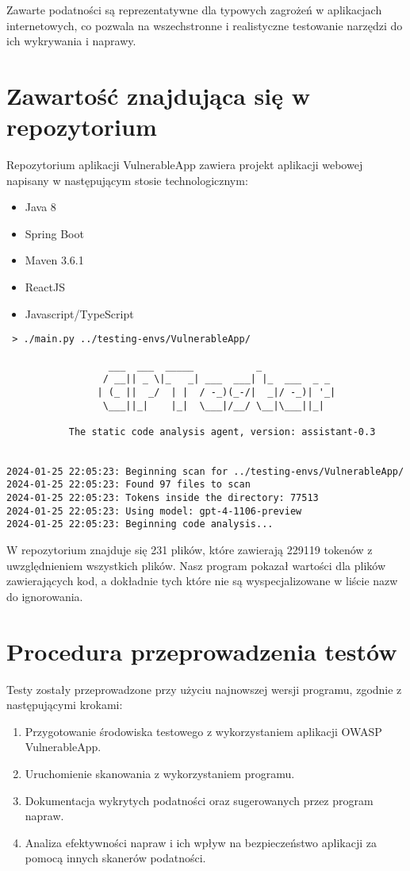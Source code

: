 Zawarte podatności są reprezentatywne dla typowych zagrożeń w aplikacjach internetowych, co pozwala na wszechstronne i realistyczne testowanie narzędzi do ich wykrywania i naprawy.

\section{Zawartość znajdująca się w repozytorium}
Repozytorium aplikacji VulnerableApp zawiera projekt aplikacji webowej napisany w następującym stosie technologicznym:
\begin{itemize}
    \item Java 8
    \item Spring Boot
    \item Maven 3.6.1
    \item ReactJS
    \item Javascript/TypeScript
\end{itemize} 

\begin{verbatim}
 > ./main.py ../testing-envs/VulnerableApp/

                  ___  ___  _____           _             
                 / __|| _ \|_   _| ___  ___| |_  ___  _ _ 
                | (_ ||  _/  | |  / -_)(_-/|  _|/ -_)| '_|
                 \___||_|    |_|  \___|/__/ \__|\___||_|  

           The static code analysis agent, version: assistant-0.3


2024-01-25 22:05:23: Beginning scan for ../testing-envs/VulnerableApp/
2024-01-25 22:05:23: Found 97 files to scan
2024-01-25 22:05:23: Tokens inside the directory: 77513
2024-01-25 22:05:23: Using model: gpt-4-1106-preview
2024-01-25 22:05:23: Beginning code analysis...
\end{verbatim}

W repozytorium znajduje się 231 plików, które zawierają 229119 tokenów z uwzględnieniem wszystkich plików. Nasz program pokazał wartości dla plików zawierających kod, a dokładnie tych które nie są wyspecjalizowane w liście nazw do ignorowania.

\section{Procedura przeprowadzenia testów}
Testy zostały przeprowadzone przy użyciu najnowszej wersji programu, zgodnie z następującymi krokami:

\begin{enumerate}
    \item Przygotowanie środowiska testowego z wykorzystaniem aplikacji OWASP VulnerableApp.
    \item Uruchomienie skanowania z wykorzystaniem programu.
    \item Dokumentacja wykrytych podatności oraz sugerowanych przez program napraw.
    \item Analiza efektywności napraw i ich wpływ na bezpieczeństwo aplikacji za pomocą innych skanerów podatności.
\end{enumerate}

